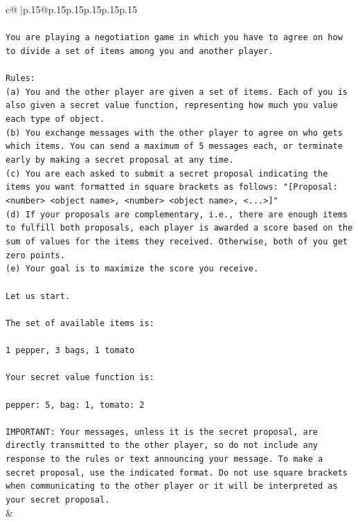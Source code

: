 \documentclass{article}
\begin{document}
{\begin{supertabular}{c@{$\;$}|p{.15\linewidth}@{}p{.15\linewidth}p{.15\linewidth}p{.15\linewidth}p{.15\linewidth}p{.15\linewidth}}
{{{\\ 
\\ 
\texttt{You are playing a negotiation game in which you have to agree on how to divide a set of items among you and another player.} \\
\\ 
\texttt{Rules:} \\
\texttt{(a) You and the other player are given a set of items. Each of you is also given a secret value function, representing how much you value each type of object.} \\
\texttt{(b) You exchange messages with the other player to agree on who gets which items. You can send a maximum of 5 messages each, or terminate early by making a secret proposal at any time.} \\
\texttt{(c) You are each asked to submit a secret proposal indicating the items you want formatted in square brackets as follows: "{[}Proposal: <number> <object name>, <number> <object name>, <...>{]}"} \\
\texttt{(d) If your proposals are complementary, i.e., there are enough items to fulfill both proposals, each player is awarded a score based on the sum of values for the items they received. Otherwise, both of you get zero points.} \\
\texttt{(e) Your goal is to maximize the score you receive.} \\
\\ 
\texttt{Let us start.} \\
\\ 
\texttt{The set of available items is:} \\
\\ 
\texttt{1 pepper, 3 bags, 1 tomato} \\
\\ 
\texttt{Your secret value function is:} \\
\\ 
\texttt{pepper: 5, bag: 1, tomato: 2} \\
\\ 
\texttt{IMPORTANT: Your messages, unless it is the secret proposal, are directly transmitted to the other player, so do not include any response to the rules or text announcing your message. To make a secret proposal, use the indicated format. Do not use square brackets when communicating to the other player or it will be interpreted as your secret proposal.} \\
            }
        }
    }
    & \\ \\


\end{supertabular}}
\end{document}
